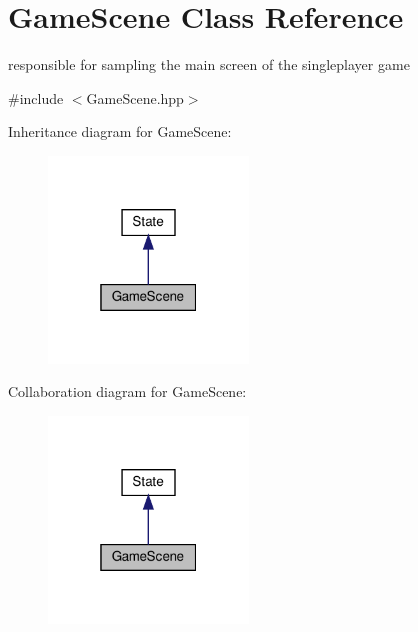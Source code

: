 \hypertarget{classGameScene}{}\section{Game\+Scene Class Reference}
\label{classGameScene}


responsible for sampling the main screen of the singleplayer game  




{\ttfamily \#include $<$Game\+Scene.\+hpp$>$}



Inheritance diagram for Game\+Scene\+:
\nopagebreak
\begin{figure}[H]
\begin{center}
\leavevmode
\includegraphics[width=151pt]{classGameScene__inherit__graph}
\end{center}
\end{figure}


Collaboration diagram for Game\+Scene\+:
\nopagebreak
\begin{figure}[H]
\begin{center}
\leavevmode
\includegraphics[width=151pt]{classGameScene__coll__graph}
\end{center}
\end{figure}

